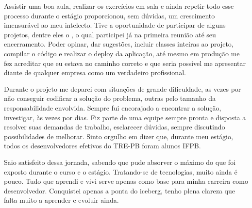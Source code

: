 Assistir uma boa aula, realizar os exercícios em sala e ainda repetir todo esse processo durante o estágio proporcionou, sem dúvidas, um crescimento imensurável ao meu intelecto. Tive a oportunidade de participar de alguns projetos, dentre eles o \imprimirtitulo \space, o qual participei já na primeira reunião até seu encerramento. Poder opinar, dar sugestões, incluir classes inteiras ao projeto, compilar o código e realizar o deploy da aplicação, até mesmo em produção me fez acreditar que eu estava no caminho correto e que seria possível me apresentar diante de qualquer empresa como um verdadeiro profissional.

Durante o projeto me deparei com situações de grande dificuldade, as vezes por não conseguir codificar a solução do problema, outras pelo tamanho da responsabilidade envolvida. Sempre fui encorajado a encontrar a solução, investigar, às vezes por dias.
Fiz parte de uma equipe sempre pronta e disposta a resolver suas demandas de trabalho, esclarecer dúvidas, sempre discutindo possibilidades de melhorar. Sinto orgulho em dizer que, durante meu estágio, todos os desenvolvedores efetivos do TRE-PB foram alunos IFPB.

Saio satisfeito dessa jornada, sabendo que pude absorver o máximo do que foi exposto durante o curso e o estágio. Tratando-se de tecnologias, muito ainda é pouco. Tudo que aprendi e vivi serve apenas como base para minha carreira como desenvolvedor. Conquistei apenas a ponta do iceberg, tenho plena clareza que falta muito a aprender e evoluir ainda. 